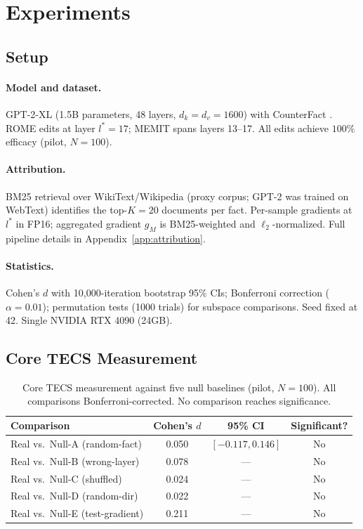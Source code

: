 \section{Experiments}
\label{sec:experiment}

\subsection{Setup}
\label{sec:setup}

\paragraph{Model and dataset.}
GPT-2-XL (1.5B parameters, 48 layers, $d_k = d_v = 1600$) with CounterFact \citep{meng2022locating}.
ROME edits at layer $l^* = 17$; MEMIT spans layers 13--17.
All edits achieve $100\%$ efficacy (pilot, $N{=}100$).

\paragraph{Attribution.}
BM25 retrieval over WikiText/Wikipedia (proxy corpus; GPT-2 was trained on WebText) identifies the top-$K{=}20$ documents per fact.
Per-sample gradients at $l^*$ in FP16; aggregated gradient $g_M$ is BM25-weighted and $\ell_2$-normalized.
Full pipeline details in Appendix~\ref{app:attribution}.

\paragraph{Statistics.}
Cohen's $d$ with 10{,}000-iteration bootstrap 95\% CIs; Bonferroni correction ($\alpha = 0.01$); permutation tests (1000 trials) for subspace comparisons.
Seed fixed at 42.
Single NVIDIA RTX 4090 (24GB).

\subsection{Core TECS Measurement}
\label{sec:core_tecs}

\begin{table}[t]
\caption{Core TECS measurement against five null baselines (pilot, $N{=}100$). All comparisons Bonferroni-corrected. No comparison reaches significance.}
\label{tab:tecs_core}
\centering
\small
\begin{tabular}{@{}lccc@{}}
\toprule
Comparison & Cohen's $d$ & 95\% CI & Significant? \\
\midrule
Real vs.\ Null-A (random-fact) & 0.050 & $[-0.117, 0.146]$ & No \\
Real vs.\ Null-B (wrong-layer) & 0.078 & --- & No \\
Real vs.\ Null-C (shuffled) & 0.024 & --- & No \\
Real vs.\ Null-D (random-dir) & 0.022 & --- & No \\
Real vs.\ Null-E (test-gradient) & 0.211 & --- & No \\
\bottomrule
\end{tabular}
\end{table}

